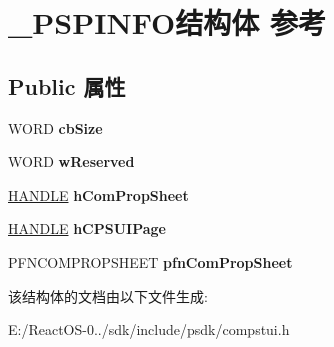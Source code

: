 \hypertarget{struct___p_s_p_i_n_f_o}{}\section{\+\_\+\+P\+S\+P\+I\+N\+F\+O结构体 参考}
\label{struct___p_s_p_i_n_f_o}
\subsection*{Public 属性}
\begin{DoxyCompactItemize}
\item 
\mbox{\label{struct___p_s_p_i_n_f_o_aa72ee82f0e4cb9d4ae6ad261880ad2e1}} 
W\+O\+RD {\bfseries cb\+Size}
\item 
\mbox{\label{struct___p_s_p_i_n_f_o_af4b28a37a84f143388c99c5a83f845a6}} 
W\+O\+RD {\bfseries w\+Reserved}
\item 
\mbox{\label{struct___p_s_p_i_n_f_o_a9f375283c7f59297e76273930284bbe5}} 
\hyperlink{interfacevoid}{H\+A\+N\+D\+LE} {\bfseries h\+Com\+Prop\+Sheet}
\item 
\mbox{\label{struct___p_s_p_i_n_f_o_a8df3a9c68a69e549f6977ac2d4abd1fd}} 
\hyperlink{interfacevoid}{H\+A\+N\+D\+LE} {\bfseries h\+C\+P\+S\+U\+I\+Page}
\item 
\mbox{\label{struct___p_s_p_i_n_f_o_a6d346e7392a8a3dd663ddf06d869cf60}} 
P\+F\+N\+C\+O\+M\+P\+R\+O\+P\+S\+H\+E\+ET {\bfseries pfn\+Com\+Prop\+Sheet}
\end{DoxyCompactItemize}


该结构体的文档由以下文件生成\+:\begin{DoxyCompactItemize}
\item 
E\+:/\+React\+O\+S-\/0../sdk/include/psdk/compstui.\+h\end{DoxyCompactItemize}
